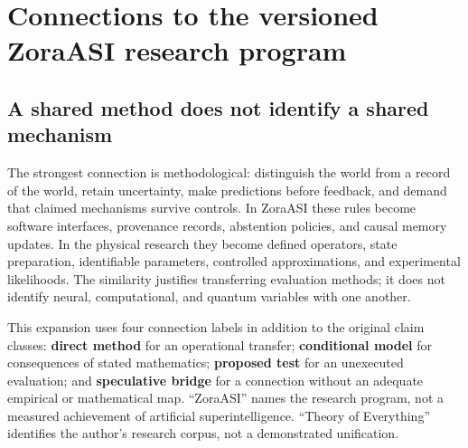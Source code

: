 \clearpage
\section{Connections to the versioned ZoraASI research program}
\label{sec:zora}
\subsection{A shared method does not identify a shared mechanism}
The strongest connection is methodological: distinguish the world from a record of the world, retain uncertainty, make predictions before feedback, and demand that claimed mechanisms survive controls. In ZoraASI these rules become software interfaces, provenance records, abstention policies, and causal memory updates. In the physical research they become defined operators, state preparation, identifiable parameters, controlled approximations, and experimental likelihoods. The similarity justifies transferring evaluation methods; it does not identify neural, computational, and quantum variables with one another.

This expansion uses four connection labels in addition to the original claim classes: \textbf{direct method} for an operational transfer; \textbf{conditional model} for consequences of stated mathematics; \textbf{proposed test} for an unexecuted evaluation; and \textbf{speculative bridge} for a connection without an adequate empirical or mathematical map. ``ZoraASI'' names the research program, not a measured achievement of artificial superintelligence. ``Theory of Everything'' identifies the author's research corpus, not a demonstrated unification.

